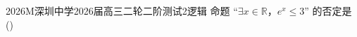 
\begin{problem}{2026}{M}{深圳中学2026届高三二轮二阶测试}{2}{逻辑}
命题 “$\exists x\in\mathbb{R}$，$e^x\leq3$” 的否定是 (\hspace{1cm})
\begin{choices}
\end{choices}
\end{problem}